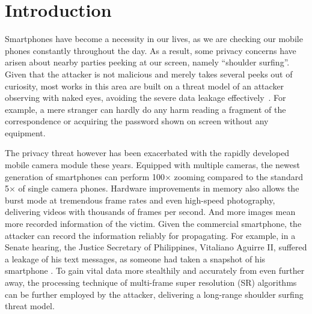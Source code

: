 \section{Introduction}
\label{sec-introduction}

Smartphones have become a necessity in our lives, as we are checking our mobile phones constantly throughout the day. As a result, some privacy concerns have arisen about nearby parties peeking at our screen, namely ``shoulder surfing''. 
Given that the attacker is not malicious and merely takes several peeks out of curiosity, most works in this area are built on a threat model of an attacker observing with naked eyes, avoiding the severe data leakage effectively~\cite{eiband2017understanding}. For example, a mere stranger can hardly do any harm reading a fragment of the correspondence or acquiring the password shown on screen without any equipment. 


The privacy threat however has been exacerbated with the rapidly developed mobile camera module these years. Equipped with multiple cameras, the newest generation of smartphones can perform 100$\times$ zooming compared to the standard 5$\times$ of single camera phones. Hardware improvements in memory also allows the burst mode at tremendous frame rates and even high-speed photography, delivering videos with thousands of frames per second. And more images mean more recorded information of the victim. Given the commercial smartphone, the attacker can record the information reliably for propagating. For example, in a Senate hearing, the Justice Secretary of Philippines, Vitaliano Aguirre II, suffered a leakage of his text messages, as someone had taken a snapshot of his smartphone \cite{Polotiko2017leakage}. To gain vital data more stealthily and accurately from even further away, the processing technique of multi-frame super resolution (SR) algorithms can be further employed by the attacker, delivering a long-range shoulder surfing threat model.

